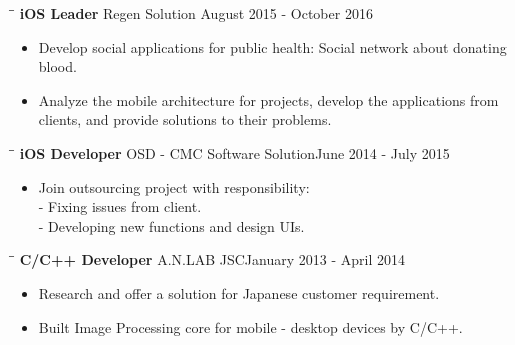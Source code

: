 \documentclass[margin, 10pt]{res}
\begin{document}
\begin{resume}
   \begin{tabbing}
   \hspace{2.0in}\= \hspace{2.0in}\= \kill %
   {\bf iOS Leader} \>Regen Solution \>August 2015 - October 2016\\
   \end{tabbing}\vspace{-20pt} %

   \begin{itemize}
   		\item Develop social applications for public health: Social network about donating blood.
		\item Analyze the mobile architecture for projects, develop the applications from clients, and provide solutions to their problems.
   \end{itemize}

   \begin{tabbing}
   \hspace{2.0in}\= \hspace{2.0in}\= \kill %
   {\bf iOS Developer} \>OSD - CMC  Software Solution\>June 2014 - July 2015\\
   \end{tabbing}\vspace{-20pt} %

   \begin{itemize}
   		\item Join outsourcing project with responsibility: \\ - Fixing issues from client. \\ - Developing new functions and design UIs. 
   \end{itemize}
   
   \begin{tabbing}
   \hspace{2.0in}\= \hspace{2.0in}\= \kill %
   {\bf C/C++ Developer} \>A.N.LAB JSC\>January 2013 - April 2014\\
   \end{tabbing}\vspace{-20pt} %

   \begin{itemize}
   		\item Research and offer a solution for Japanese customer requirement. 
		\item Built Image Processing core for mobile - desktop devices by C/C++.		
		

\end{itemize}
\end{resume}
\end{document}
